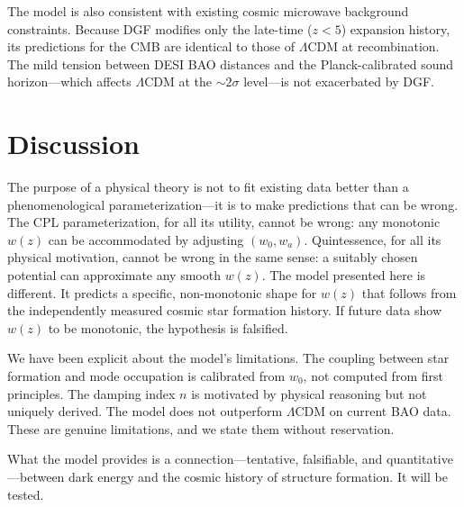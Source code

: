 \documentclass[12pt,a4paper]{article}
\begin{document}
The model is also consistent with existing cosmic microwave background constraints. Because DGF modifies only the late-time ($z<5$) expansion history, its predictions for the CMB are identical to those of $\Lambda$CDM at recombination. The mild tension between DESI BAO distances and the Planck-calibrated sound horizon---which affects $\Lambda$CDM at the $\sim2\sigma$ level---is not exacerbated by DGF.

\section*{Discussion}

The purpose of a physical theory is not to fit existing data better than a phenomenological parameterization---it is to make predictions that can be wrong. The CPL parameterization, for all its utility, cannot be wrong: any monotonic $w(z)$ can be accommodated by adjusting $(w_0,w_a)$. Quintessence, for all its physical motivation, cannot be wrong in the same sense: a suitably chosen potential can approximate any smooth $w(z)$. The model presented here is different. It predicts a specific, non-monotonic shape for $w(z)$ that follows from the independently measured cosmic star formation history. If future data show $w(z)$ to be monotonic, the hypothesis is falsified.

We have been explicit about the model's limitations. The coupling between star formation and mode occupation is calibrated from $w_0$, not computed from first principles. The damping index $n$ is motivated by physical reasoning but not uniquely derived. The model does not outperform $\Lambda$CDM on current BAO data. These are genuine limitations, and we state them without reservation.

What the model provides is a connection---tentative, falsifiable, and quantitative---between dark energy and the cosmic history of structure formation. It will be tested.
\end{document}
